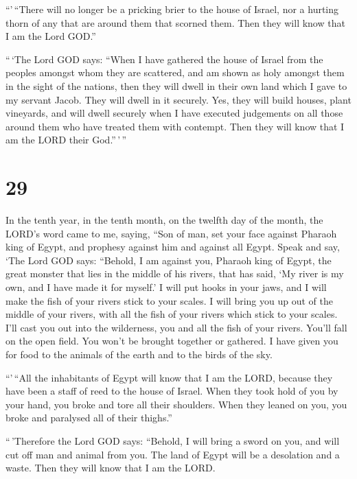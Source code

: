  ``'\,``There will no longer be a pricking brier to the
house of Israel, nor a hurting thorn of any that are around them that
scorned them. Then they will know that I am the Lord GOD.''

 ``\,`The Lord GOD says: ``When I have gathered the house
of Israel from the peoples amongst whom they are scattered, and am shown
as holy amongst them in the sight of the nations, then they will dwell
in their own land which I gave to my servant Jacob.  They
will dwell in it securely. Yes, they will build houses, plant vineyards,
and will dwell securely when I have executed judgements on all those
around them who have treated them with contempt. Then they will know
that I am the LORD their God.''\,'\,''

\hypertarget{section-27}{%
\section{29}\label{section-27}}

 In the tenth year, in the tenth month, on the twelfth day
of the month, the LORD's word came to me, saying,  ``Son of
man, set your face against Pharaoh king of Egypt, and prophesy against
him and against all Egypt.  Speak and say, `The Lord GOD
says: ``Behold, I am against you, Pharaoh king of Egypt, the great
monster that lies in the middle of his rivers, that has said, `My river
is my own, and I have made it for myself.'  I will put hooks
in your jaws, and I will make the fish of your rivers stick to your
scales. I will bring you up out of the middle of your rivers, with all
the fish of your rivers which stick to your scales.  I'll
cast you out into the wilderness, you and all the fish of your rivers.
You'll fall on the open field. You won't be brought together or
gathered. I have given you for food to the animals of the earth and to
the birds of the sky.

 ``'\,``All the inhabitants of Egypt will know that I am the
LORD, because they have been a staff of reed to the house of Israel.
 When they took hold of you by your hand, you broke and tore
all their shoulders. When they leaned on you, you broke and paralysed
all of their thighs.''

 ``\,'Therefore the Lord GOD says: ``Behold, I will bring a
sword on you, and will cut off man and animal from you.  The
land of Egypt will be a desolation and a waste. Then they will know that
I am the LORD.


